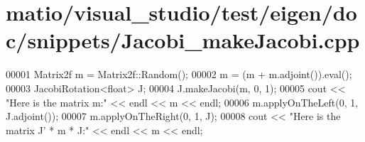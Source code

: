 \hypertarget{matio_2visual__studio_2test_2eigen_2doc_2snippets_2_jacobi__make_jacobi_8cpp_source}{}\section{matio/visual\+\_\+studio/test/eigen/doc/snippets/\+Jacobi\+\_\+make\+Jacobi.cpp}
\label{matio_2visual__studio_2test_2eigen_2doc_2snippets_2_jacobi__make_jacobi_8cpp_source}

\begin{DoxyCode}
00001 Matrix2f m = Matrix2f::Random();
00002 m = (m + m.adjoint()).eval();
00003 JacobiRotation<float> J;
00004 J.makeJacobi(m, 0, 1);
00005 cout << \textcolor{stringliteral}{"Here is the matrix m:"} << endl << m << endl;
00006 m.applyOnTheLeft(0, 1, J.adjoint());
00007 m.applyOnTheRight(0, 1, J);
00008 cout << \textcolor{stringliteral}{"Here is the matrix J' * m * J:"} << endl << m << endl;
\end{DoxyCode}

